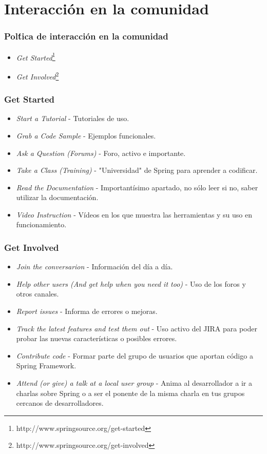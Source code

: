 \documentclass[xcolor=dvipsnames]{beamer}
\begin{document}
\section{Interacci\'on en la comunidad}
\begin{frame}[allowframebreaks]
\frametitle{Pol\'tica de interacci\'on en la comunidad}
\begin{itemize}
    \item \emph{Get Started}\footnote{http://www.springsource.org/get-started}
    \item \emph{Get Involved}\footnote{http://www.springsource.org/get-involved}
\end{itemize}
\end{frame}

\begin{frame}[allowframebreaks]
\frametitle{Get Started}
\begin{itemize}
    \item \emph{Start a Tutorial} - Tutoriales de uso.
    \item \emph{Grab a Code Sample} - Ejemplos funcionales.
    \item \emph{Ask a Question (Forums)} - Foro, activo e importante.
    \item \emph{Take a Class (Training)} - "Universidad" de Spring para aprender a codificar.
    \item \emph{Read the Documentation} - Important\'isimo apartado, no s\'olo leer si no, saber utilizar la documentaci\'on.
    \item \emph{Video Instruction} - V\'ideos en los que muestra las herramientas y su uso en funcionamiento.
\end{itemize}
\end{frame}

\begin{frame}[allowframebreaks]
\frametitle{Get Involved}
\begin{itemize}
    \item \emph{Join the conversarion} - Informaci\'on del d\'ia a d\'ia.
    \item \emph{Help other users (And get help when you need it too)} - Uso de los foros y otros canales.
    \item \emph{Report issues} - Informa de errores o mejoras.
    \item \emph{Track the latest features and test them out} - Uso activo del JIRA para poder probar las nuevas caracter\'isticas o posibles errores.
    \item \emph{Contribute code} - Formar parte del grupo de usuarios que aportan c\'odigo a Spring Framework.
    \item \emph{Attend (or give) a talk at a local user group} - Anima al desarrollador a ir a charlas sobre Spring o a ser el ponente de la misma charla en tus grupos cercanos de desarrolladores.
\end{itemize}
\end{frame}
\end{document}
